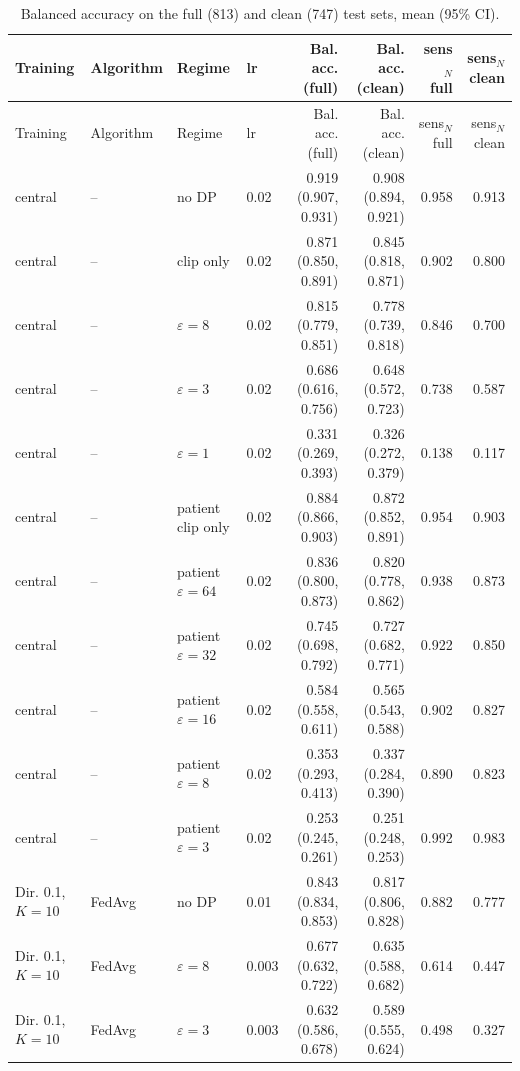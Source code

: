 {\scriptsize
\begin{longtable}{llllrrrr}
\caption{Balanced accuracy on the full (813) and clean (747) test sets, mean (95\% CI).}\label{tab:s_full_clean}\\
\toprule
Training & Algorithm & Regime & lr & Bal. acc. (full) & Bal. acc. (clean) & sens$_N$ full & sens$_N$ clean \\
\midrule
\endfirsthead
\toprule
Training & Algorithm & Regime & lr & Bal. acc. (full) & Bal. acc. (clean) & sens$_N$ full & sens$_N$ clean \\
\midrule
\endhead
\bottomrule
\endlastfoot
central & -- & no DP & 0.02 & 0.919 (0.907, 0.931) & 0.908 (0.894, 0.921) & 0.958 & 0.913 \\
central & -- & clip only & 0.02 & 0.871 (0.850, 0.891) & 0.845 (0.818, 0.871) & 0.902 & 0.800 \\
central & -- & $\varepsilon=8$ & 0.02 & 0.815 (0.779, 0.851) & 0.778 (0.739, 0.818) & 0.846 & 0.700 \\
central & -- & $\varepsilon=3$ & 0.02 & 0.686 (0.616, 0.756) & 0.648 (0.572, 0.723) & 0.738 & 0.587 \\
central & -- & $\varepsilon=1$ & 0.02 & 0.331 (0.269, 0.393) & 0.326 (0.272, 0.379) & 0.138 & 0.117 \\
central & -- & patient clip only & 0.02 & 0.884 (0.866, 0.903) & 0.872 (0.852, 0.891) & 0.954 & 0.903 \\
central & -- & patient $\varepsilon=64$ & 0.02 & 0.836 (0.800, 0.873) & 0.820 (0.778, 0.862) & 0.938 & 0.873 \\
central & -- & patient $\varepsilon=32$ & 0.02 & 0.745 (0.698, 0.792) & 0.727 (0.682, 0.771) & 0.922 & 0.850 \\
central & -- & patient $\varepsilon=16$ & 0.02 & 0.584 (0.558, 0.611) & 0.565 (0.543, 0.588) & 0.902 & 0.827 \\
central & -- & patient $\varepsilon=8$ & 0.02 & 0.353 (0.293, 0.413) & 0.337 (0.284, 0.390) & 0.890 & 0.823 \\
central & -- & patient $\varepsilon=3$ & 0.02 & 0.253 (0.245, 0.261) & 0.251 (0.248, 0.253) & 0.992 & 0.983 \\
Dir. 0.1, $K{=}10$ & FedAvg & no DP & 0.01 & 0.843 (0.834, 0.853) & 0.817 (0.806, 0.828) & 0.882 & 0.777 \\
Dir. 0.1, $K{=}10$ & FedAvg & $\varepsilon=8$ & 0.003 & 0.677 (0.632, 0.722) & 0.635 (0.588, 0.682) & 0.614 & 0.447 \\
Dir. 0.1, $K{=}10$ & FedAvg & $\varepsilon=3$ & 0.003 & 0.632 (0.586, 0.678) & 0.589 (0.555, 0.624) & 0.498 & 0.327 \\

\end{longtable}}
